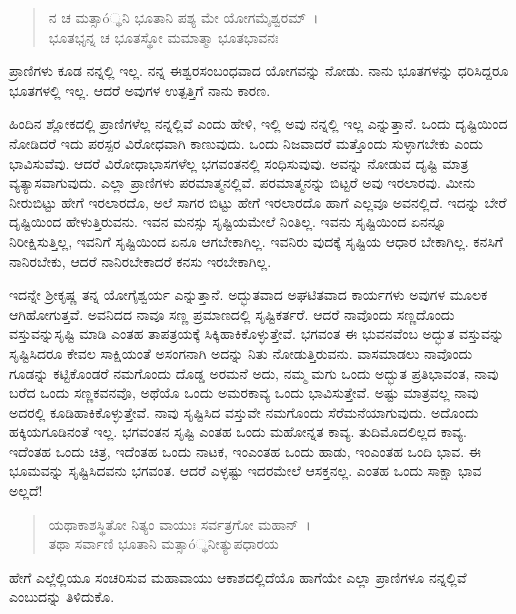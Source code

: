 \begin{verse}
ನ ಚ ಮತ್ಸಾó್ಥನಿ ಭೂತಾನಿ ಪಶ್ಯ ಮೇ ಯೋಗಮೈಶ್ವರಮ್~।\\ಭೂತಭೃನ್ನ ಚ ಭೂತಸ್ಥೋ ಮಮಾತ್ಮಾ ಭೂತಭಾವನಃ 
\end{verse}

{\small ಪ್ರಾಣಿಗಳು ಕೂಡ ನನ್ನಲ್ಲಿ ಇಲ್ಲ. ನನ್ನ ಈಶ್ವರಸಂಬಂಧವಾದ ಯೋಗವನ್ನು ನೋಡು. ನಾನು ಭೂತಗಳನ್ನು ಧರಿಸಿದ್ದರೂ ಭೂತಗಳಲ್ಲಿ ಇಲ್ಲ. ಆದರೆ ಅವುಗಳ ಉತ್ಪತ್ತಿಗೆ ನಾನು ಕಾರಣ.}

ಹಿಂದಿನ ಶ್ಲೋಕದಲ್ಲಿ ಪ್ರಾಣಿಗಳೆಲ್ಲ ನನ್ನಲ್ಲಿವೆ ಎಂದು ಹೇಳಿ, ಇಲ್ಲಿ ಅವು ನನ್ನಲ್ಲಿ ಇಲ್ಲ ಎನ್ನುತ್ತಾನೆ. ಒಂದು ದೃಷ್ಟಿಯಿಂದ ನೋಡಿದರೆ ಇದು ಪರಸ್ಪರ ವಿರೋಧವಾಗಿ ಕಾಣುವುದು. ಒಂದು ನಿಜವಾದರೆ ಮತ್ತೊಂದು ಸುಳ್ಳಾಗಬೇಕು ಎಂದು ಭಾವಿಸುವೆವು. ಆದರೆ ವಿರೋಧಾಭಾಸಗಳೆಲ್ಲ ಭಗವಂತನಲ್ಲಿ ಸಂಧಿಸುವುವು. ಅವನ್ನು ನೋಡುವ ದೃಷ್ಟಿ ಮಾತ್ರ ವ್ಯತ್ಯಾಸವಾಗುವುದು. ಎಲ್ಲಾ ಪ್ರಾಣಿಗಳು ಪರಮಾತ್ಮನಲ್ಲಿವೆ. ಪರಮಾತ್ಮನನ್ನು ಬಿಟ್ಟರೆ ಅವು ಇರಲಾರವು. ಮೀನು ನೀರುಬಿಟ್ಟು ಹೇಗೆ ಇರಲಾರದೊ, ಅಲೆ ಸಾಗರ ಬಿಟ್ಟು ಹೇಗೆ ಇರಲಾರದೊ ಹಾಗೆ ಎಲ್ಲವೂ ಅವನಲ್ಲಿದೆ. ಇದನ್ನು ಬೇರೆ ದೃಷ್ಟಿಯಿಂದ ಹೇಳುತ್ತಿರುವನು. ಇವನ ಮನಸ್ಸು ಸೃಷ್ಟಿಯಮೇಲೆ ನಿಂತಿಲ್ಲ. ಇವನು ಸೃಷ್ಟಿಯಿಂದ ಏನನ್ನೂ ನಿರೀಕ್ಷಿಸುತ್ತಿಲ್ಲ, ಇವನಿಗೆ ಸೃಷ್ಟಿಯಿಂದ ಏನೂ ಆಗಬೇಕಾಗಿಲ್ಲ. ಇವನಿರು ವುದಕ್ಕೆ ಸೃಷ್ಟಿಯ ಆಧಾರ ಬೇಕಾಗಿಲ್ಲ. ಕನಸಿಗೆ ನಾನಿರಬೇಕು, ಆದರೆ ನಾನಿರಬೇಕಾದರೆ ಕನಸು ಇರಬೇಕಾಗಿಲ್ಲ.

ಇದನ್ನೇ ಶ‍್ರೀಕೃಷ್ಣ ತನ್ನ ಯೋಗೈಶ್ವರ್ಯ ಎನ್ನುತ್ತಾನೆ. ಅದ್ಭುತವಾದ ಅಘಟಿತವಾದ ಕಾರ್ಯಗಳು ಅವುಗಳ ಮೂಲಕ ಆಗಿಹೋಗುತ್ತವೆ. ಅವನಿದದ ನಾವೂ ಸಣ್ಣ ಪ್ರಮಾಣದಲ್ಲಿ ಸೃಷ್ಟಿಕರ್ತರೆ. ಆದರೆ ನಾವೊಂದು ಸಣ್ಣದೊಂದು ವಸ್ತುವನ್ನುಸೃಷ್ಟಿ ಮಾಡಿ ಎಂತಹ ತಾಪತ್ರಯಕ್ಕೆ ಸಿಕ್ಕಿಹಾಕಿಕೊಳ್ಳುತ್ತೇವೆ. ಭಗವಂತ ಈ ಭುವನವೆಂಬ ಅದ್ಭುತ ವಸ್ತುವನ್ನು ಸೃಷ್ಟಿಸಿದರೂ ಕೇವಲ ಸಾಕ್ಷಿಯಂತೆ ಅಸಂಗನಾಗಿ ಅದನ್ನು ನಿತು ನೋಡುತ್ತಿರುವನು. ವಾಸಮಾಡಲು ನಾವೊಂದು ಗೂಡನ್ನು ಕಟ್ಟಿಕೊಂಡರೆ ನಮಗೊಂದು ದೊಡ್ಡ ಅರಮನೆ ಅದು, ನಮ್ಮ ಮಗು ಒಂದು ಅದ್ಭುತ ಪ್ರತಿಭಾವಂತ, ನಾವು ಬರೆದ ಒಂದು ಸಣ್ಣಕವನವೊ, ಅಥೆಯೊ ಒಂದು ಅಮರಕಾವ್ಯ ಒಂದು ಭಾವಿಸುತ್ತೇವೆ. ಅಷ್ಟು ಮಾತ್ರವಲ್ಲ ನಾವು ಅದರಲ್ಲಿ ಕೂಡಿಹಾಕಿಕೊಳ್ಳುತ್ತೇವೆ. ನಾವು ಸೃಷ್ಟಿಸಿದ ವಸ್ತುವೇ ನಮಗೊಂದು ಸೆರೆಮನೆಯಾಗುವುದು. ಅದೊಂದು ಹಕ್ಕಿಯಗೂಡಿನಂತೆ ಇಲ್ಲ. ಭಗವಂತನ ಸೃಷ್ಟಿ ಎಂತಹ ಒಂದು ಮಹೋನ್ನತ ಕಾವ್ಯ. ತುದಿಮೊದಲಿಲ್ಲದ ಕಾವ್ಯ. ಇದೆಂತಹ ಒಂದು ಚಿತ್ರ, ಇದೆಂತಹ ಒಂದು ನಾಟಕ, ಇಂಎಂತಹ ಒಂದು ಹಾಡು, ಇಂಎಂತಹ ಒಂದಿ ಭಾವ. ಈ ಭೂಮವನ್ನು ಸೃಷ್ಟಿಸಿದವನು ಭಗವಂತ. ಆದರೆ ಎಳ್ಳಷ್ಟು ಇದರಮೇಲೆ ಆಸಕ್ತನಲ್ಲ. ಎಂತಹ ಒಂದು ಸಾಕ್ಷಾ ಭಾವ ಅಲ್ಲದೆ!

\begin{verse}
ಯಥಾಕಾಶಸ್ಥಿತೋ ನಿತ್ಯಂ ವಾಯುಃ ಸರ್ವತ್ರಗೋ ಮಹಾನ್~।\\ತಥಾ ಸರ್ವಾಣಿ ಭೂತಾನಿ ಮತ್ಸಾó್ಥನೀತ್ಯುಪಧಾರಯ 
\end{verse}

ಹೇಗೆ ಎಲ್ಲೆಲ್ಲಿಯೂ ಸಂಚರಿಸುವ ಮಹಾವಾಯು ಆಕಾಶದಲ್ಲಿದೆಯೊ ಹಾಗೆಯೇ ಎಲ್ಲಾ ಪ್ರಾಣಿಗಳೂ ನನ್ನಲ್ಲಿವೆ ಎಂಬುದನ್ನು ತಿಳಿದುಕೊ.


